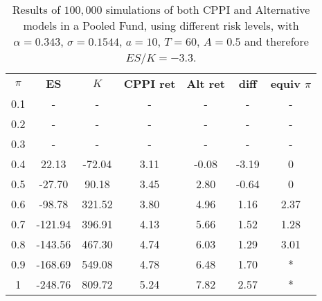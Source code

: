 \begin{table}[H]
\centering
\caption{Results of $100,000$ simulations of both CPPI and Alternative models in a Pooled Fund, using different risk levels, with $\alpha = 0.343$, $\sigma = 0.1544$, $a = 10$, $T = 60$, $A = 0.5$ and therefore $ES/K = -3.3$.}
\label{tab:cppi_alt}
\begin{tabular}{ccccccc}
\textbf{$\pi$} & \textbf{ES } & \textbf{$K$} & \textbf{CPPI ret} & \textbf{Alt ret} & \textbf{diff}  & \textbf{equiv $\pi$}\\
0.1  & -                & -                & -               & -                  & -                & -                   \\
0.2  & -                & -                & -               & -                  & -                & -                   \\
0.3  & -                & -                & -               & -                  & -                & -                   \\
0.4  & 22.13   & -72.04 & 3.11 & -0.08 & -3.19 & 0 \\
0.5  & -27.70 & 90.18  & 3.45 & 2.80    & -0.64 & 0             \\
0.6  & -98.78 & 321.52  & 3.80 & 4.96  & 1.16  & 2.37                \\
0.7  & -121.94 & 396.91  & 4.13 & 5.66  & 1.52 & 1.28              \\
0.8  & -143.56 & 467.30  & 4.74  & 6.03   & 1.29  & 3.01                   \\
0.9  & -168.69 & 549.08  & 4.78  & 6.48   & 1.70 & *                    \\
1 & -248.76 & 809.72  & 5.24  & 7.82  & 2.57 & *
\end{tabular}
\end{table}

